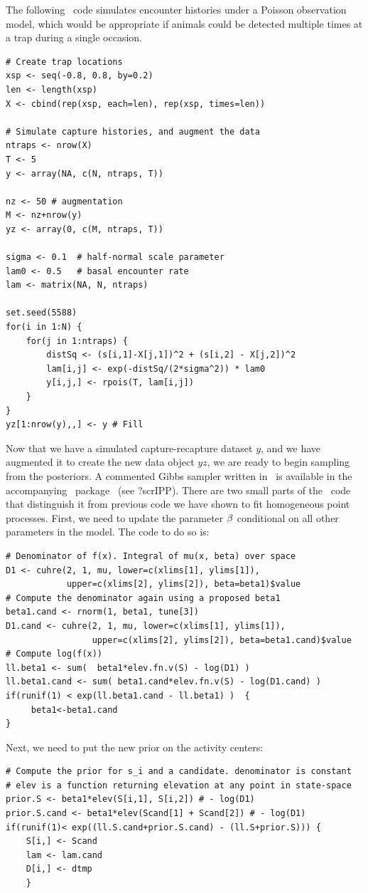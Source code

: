 The following \R~code simulates encounter histories under a
Poisson observation model, which would be appropriate if animals could
be detected multiple times at a trap during a single occasion.

\begin{small}
\begin{verbatim}
# Create trap locations
xsp <- seq(-0.8, 0.8, by=0.2)
len <- length(xsp)
X <- cbind(rep(xsp, each=len), rep(xsp, times=len))

# Simulate capture histories, and augment the data
ntraps <- nrow(X)
T <- 5
y <- array(NA, c(N, ntraps, T))

nz <- 50 # augmentation
M <- nz+nrow(y)
yz <- array(0, c(M, ntraps, T))

sigma <- 0.1  # half-normal scale parameter
lam0 <- 0.5   # basal encounter rate
lam <- matrix(NA, N, ntraps)

set.seed(5588)
for(i in 1:N) {
    for(j in 1:ntraps) {
        distSq <- (s[i,1]-X[j,1])^2 + (s[i,2] - X[j,2])^2
        lam[i,j] <- exp(-distSq/(2*sigma^2)) * lam0
        y[i,j,] <- rpois(T, lam[i,j])
    }
}
yz[1:nrow(y),,] <- y # Fill
\end{verbatim}
\end{small}

Now that we have a simulated capture-recapture dataset $y$, and we have
augmented it to create the new data object $yz$, we are ready to
begin sampling from the posteriors. A commented Gibbs sampler written
in \R~is available in the accompanying \R~package \scrbook~(see
?scrIPP). There are two small parts of the
\R~code that distinguish it from previous code we have shown to
fit homogeneous point processes. First, we need to update the parameter
${\bf \beta}$ conditional on all other parameters in the model. The code to
do so is:

\begin{small}
\begin{verbatim}
# Denominator of f(x). Integral of mu(x, beta) over space
D1 <- cuhre(2, 1, mu, lower=c(xlims[1], ylims[1]),
            upper=c(xlims[2], ylims[2]), beta=beta1)$value
# Compute the denominator again using a proposed beta1
beta1.cand <- rnorm(1, beta1, tune[3])
D1.cand <- cuhre(2, 1, mu, lower=c(xlims[1], ylims[1]),
                 upper=c(xlims[2], ylims[2]), beta=beta1.cand)$value
# Compute log(f(x))
ll.beta1 <- sum(  beta1*elev.fn.v(S) - log(D1) )
ll.beta1.cand <- sum( beta1.cand*elev.fn.v(S) - log(D1.cand) )
if(runif(1) < exp(ll.beta1.cand - ll.beta1) )  {
     beta1<-beta1.cand
}
\end{verbatim}
\end{small}
Next, we need to put the new prior on the activity centers:
\begin{small}
\begin{verbatim}
# Compute the prior for s_i and a candidate. denominator is constant
# elev is a function returning elevation at any point in state-space
prior.S <- beta1*elev(S[i,1], S[i,2]) # - log(D1)
prior.S.cand <- beta1*elev(Scand[1] + Scand[2]) # - log(D1)
if(runif(1)< exp((ll.S.cand+prior.S.cand) - (ll.S+prior.S))) {
    S[i,] <- Scand
    lam <- lam.cand
    D[i,] <- dtmp
    }
\end{verbatim}
\end{small}

